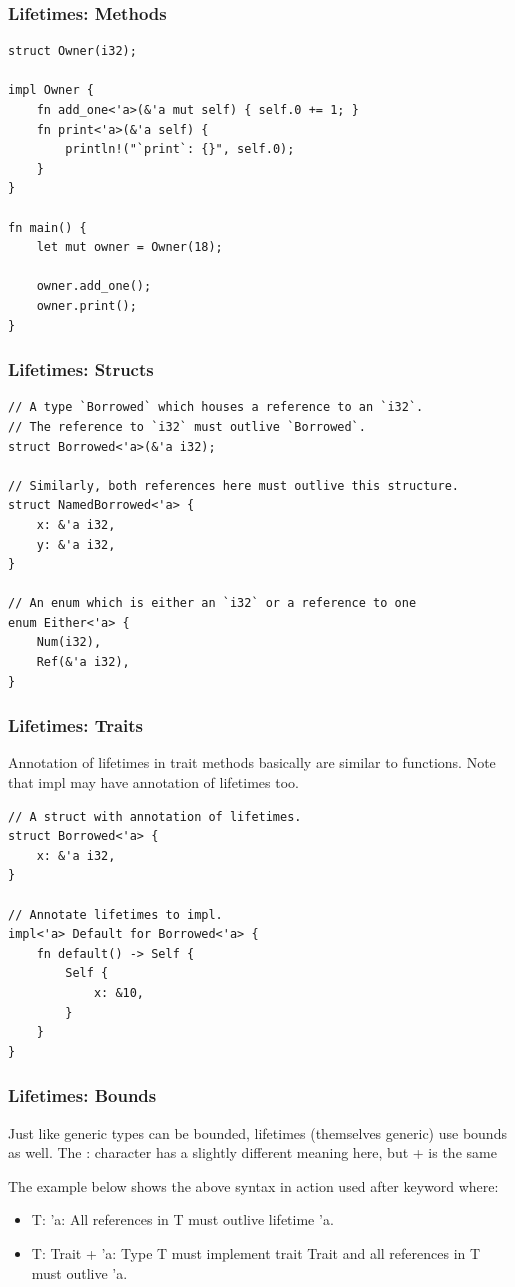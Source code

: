 \documentclass[aspectratio=1610,t]{beamer}
\begin{document}

\begin{frame}[fragile]
\frametitle{Lifetimes: Methods}
\begin{verbatim}
struct Owner(i32);

impl Owner {
    fn add_one<'a>(&'a mut self) { self.0 += 1; }
    fn print<'a>(&'a self) {
        println!("`print`: {}", self.0);
    }
}

fn main() {
    let mut owner = Owner(18);

    owner.add_one();
    owner.print();
}
\end{verbatim}
\end{frame}


\begin{frame}[fragile]
\frametitle{Lifetimes: Structs}
\begin{verbatim}
// A type `Borrowed` which houses a reference to an `i32`.
// The reference to `i32` must outlive `Borrowed`.
struct Borrowed<'a>(&'a i32);

// Similarly, both references here must outlive this structure.
struct NamedBorrowed<'a> {
    x: &'a i32,
    y: &'a i32,
}

// An enum which is either an `i32` or a reference to one
enum Either<'a> {
    Num(i32),
    Ref(&'a i32),
}
\end{verbatim}
\end{frame}


\begin{frame}[fragile]
\frametitle{Lifetimes: Traits}
Annotation of lifetimes in trait methods basically are similar to functions. Note that impl may have annotation of lifetimes too.
\begin{verbatim}
// A struct with annotation of lifetimes.
struct Borrowed<'a> {
    x: &'a i32,
}

// Annotate lifetimes to impl.
impl<'a> Default for Borrowed<'a> {
    fn default() -> Self {
        Self {
            x: &10,
        }
    }
}
\end{verbatim}
\end{frame}


\begin{frame}[fragile]
\frametitle{Lifetimes: Bounds}
Just like generic types can be bounded, lifetimes (themselves generic) use bounds as well. The : character has a slightly different meaning here, but + is the same

The example below shows the above syntax in action used after keyword where:
\begin{itemize}
    \item T: 'a: All references in T must outlive lifetime 'a.
    \item T: Trait + 'a: Type T must implement trait Trait and all references in T must outlive 'a.
\end{itemize}
\end{frame}
\end{document}
